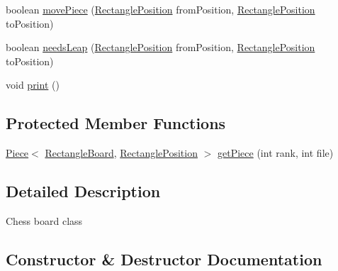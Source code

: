 \begin{DoxyCompactItemize}
\item 
boolean \hyperlink{classedu_1_1xwei12_1_1_chess_1_1_rectangle_board_a12cd647f9fa168c7a12251c51df95d1e}{move\+Piece} (\hyperlink{classedu_1_1xwei12_1_1_chess_1_1_rectangle_position}{Rectangle\+Position} from\+Position, \hyperlink{classedu_1_1xwei12_1_1_chess_1_1_rectangle_position}{Rectangle\+Position} to\+Position)
\item 
boolean \hyperlink{classedu_1_1xwei12_1_1_chess_1_1_rectangle_board_a62c417dc23d2a569032e49ea902f2d0a}{needs\+Leap} (\hyperlink{classedu_1_1xwei12_1_1_chess_1_1_rectangle_position}{Rectangle\+Position} from\+Position, \hyperlink{classedu_1_1xwei12_1_1_chess_1_1_rectangle_position}{Rectangle\+Position} to\+Position)
\item 
void \hyperlink{classedu_1_1xwei12_1_1_chess_1_1_rectangle_board_a0b6a453ca4fcc71610480c5d2b89275d}{print} ()
\end{DoxyCompactItemize}
\subsection*{Protected Member Functions}
\begin{DoxyCompactItemize}
\item 
\hyperlink{classedu_1_1xwei12_1_1_chess_1_1_piece}{Piece}$<$ \hyperlink{classedu_1_1xwei12_1_1_chess_1_1_rectangle_board}{Rectangle\+Board}, \hyperlink{classedu_1_1xwei12_1_1_chess_1_1_rectangle_position}{Rectangle\+Position} $>$ \hyperlink{classedu_1_1xwei12_1_1_chess_1_1_rectangle_board_ac2b2137a21451eb19724f5c5e0f967d1}{get\+Piece} (int rank, int file)
\end{DoxyCompactItemize}


\subsection{Detailed Description}
Chess board class 

\subsection{Constructor \& Destructor Documentation}
